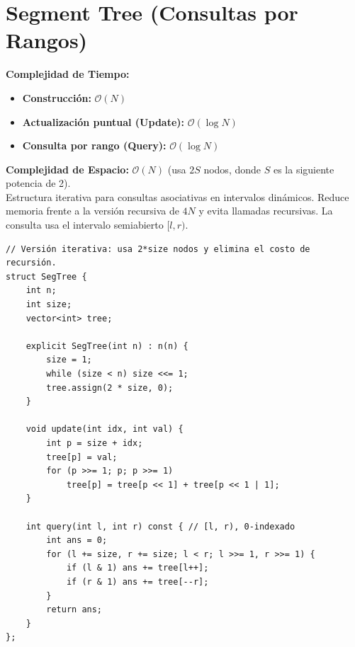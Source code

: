 \documentclass[10pt,twocolumn,letterpaper]{report}
\begin{document}
\section{Segment Tree (Consultas por Rangos)}
\textbf{Complejidad de Tiempo:}
\begin{itemize}
    \item \textbf{Construcción:} $\mathcal{O}(N)$
    \item \textbf{Actualización puntual (Update):} $\mathcal{O}(\log N)$
    \item \textbf{Consulta por rango (Query):} $\mathcal{O}(\log N)$
\end{itemize}
\textbf{Complejidad de Espacio:} $\mathcal{O}(N)$ (usa $2S$ nodos, donde $S$ es la siguiente potencia de 2). \\
Estructura iterativa para consultas asociativas en intervalos dinámicos. Reduce memoria frente a la versión recursiva de $4N$ y evita llamadas recursivas. La consulta usa el intervalo semiabierto $[l,r)$.
\begin{lstlisting}
// Versión iterativa: usa 2*size nodos y elimina el costo de recursión.
struct SegTree {
    int n;
    int size;
    vector<int> tree;

    explicit SegTree(int n) : n(n) {
        size = 1;
        while (size < n) size <<= 1;
        tree.assign(2 * size, 0);
    }

    void update(int idx, int val) {
        int p = size + idx;
        tree[p] = val;
        for (p >>= 1; p; p >>= 1)
            tree[p] = tree[p << 1] + tree[p << 1 | 1];
    }

    int query(int l, int r) const { // [l, r), 0-indexado
        int ans = 0;
        for (l += size, r += size; l < r; l >>= 1, r >>= 1) {
            if (l & 1) ans += tree[l++];
            if (r & 1) ans += tree[--r];
        }
        return ans;
    }
};
\end{lstlisting}
\end{document}
